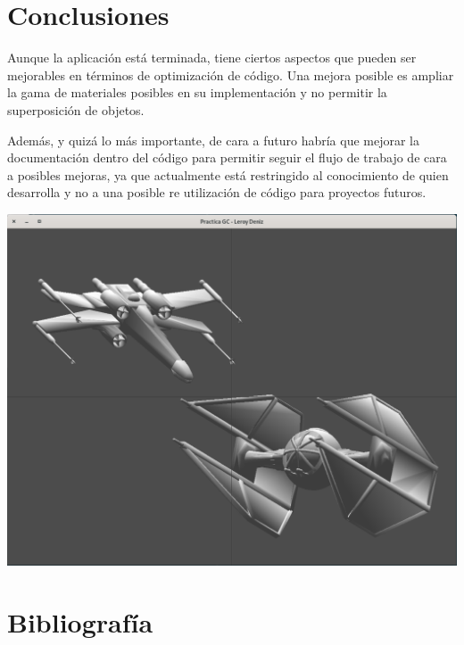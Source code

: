 \documentclass[12pt,a4paper]{article}
\begin{document}
\newpage
\section{Conclusiones}

Aunque la aplicación está terminada, tiene ciertos aspectos que pueden ser mejorables en términos de optimización de código. Una mejora posible es ampliar la gama de materiales posibles en su implementación y no permitir la superposición de objetos.

Además, y quizá lo más importante, de cara a futuro habría que mejorar la documentación dentro del código para permitir seguir el flujo de trabajo de cara a posibles mejoras, ya que actualmente está restringido al conocimiento de quien desarrolla y no a una posible re utilización de código para proyectos futuros.


\begin{center}
\includegraphics[width=14cm]{images/naves}
\end{center}





\newpage
\section{Bibliografía}
\end{document}
